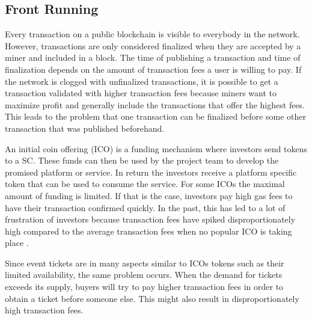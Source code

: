
\subsection{Front Running}\label{subsection:front-running}

Every transaction on a public blockchain is visible to everybody in the network. However, transactions are only considered finalized when they are accepted by a miner and included in a block. The time of publishing a transaction and time of finalization depends on the amount of transaction fees a user is willing to pay. If the network is clogged with unfinalized transactions, it is possible to get a transaction validated with higher transaction fees because miners want to maximize profit and generally include the transactions that offer the highest fees. This leads to the problem that one transaction can be finalized before some other transaction that was published beforehand. 

An initial coin offering (ICO) is a funding mechanism where investors send tokens to a SC. These funds can then be used by the project team to develop the promised platform or service. In return the investors receive a platform specific token that can be used to consume the service. For some ICOs the maximal amount of funding is limited. If that is the case, investors pay high gas fees to have their transaction confirmed quickly. In the past, this has led to a lot of frustration of investors because transaction fees have spiked disproportionately high compared to the average transaction fees when no popular ICO is taking place \cite{bat-ico-tx-fees} \cite{ico-paradox}.

Since event tickets are in many aspects similar to ICOs tokens such as their limited availability, the same problem occurs. When the demand for tickets exceeds its supply, buyers will try to pay higher transaction fees in order to obtain a ticket before someone else. This might also result in disproportionately high transaction fees. 
